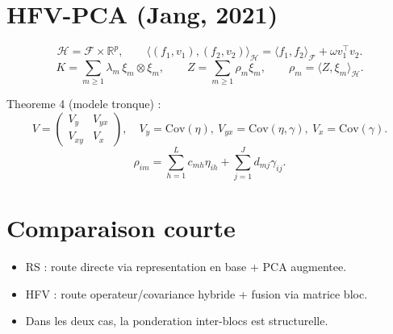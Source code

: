 \section{HFV-PCA (Jang, 2021)}

\[
\mathcal{H}=\mathcal{F}\times\mathbb{R}^p,\qquad
\langle (f_1,v_1),(f_2,v_2)\rangle_{\mathcal{H}}
=\langle f_1,f_2\rangle_{\mathcal{F}}+\omega v_1^\top v_2.
\]
\[
K=\sum_{m\ge1}\lambda_m\,\xi_m\otimes\xi_m,\qquad
Z=\sum_{m\ge1}\rho_m\xi_m,\qquad
\rho_m=\langle Z,\xi_m\rangle_{\mathcal{H}}.
\]

Theoreme 4 (modele tronque) :
\[
V=
\begin{pmatrix}
V_y&V_{yx}\\
V_{xy}&V_x
\end{pmatrix},
\quad
V_y=\mathrm{Cov}(\eta),\ 
V_{yx}=\mathrm{Cov}(\eta,\gamma),\ 
V_x=\mathrm{Cov}(\gamma).
\]
\[
\rho_{im}=\sum_{h=1}^L c_{mh}\eta_{ih}+\sum_{j=1}^J d_{mj}\gamma_{ij}.
\]

\section{Comparaison courte}

\begin{itemize}
  \item RS : route directe via representation en base + PCA augmentee.
  \item HFV : route operateur/covariance hybride + fusion via matrice bloc.
  \item Dans les deux cas, la ponderation inter-blocs est structurelle.
\end{itemize}

